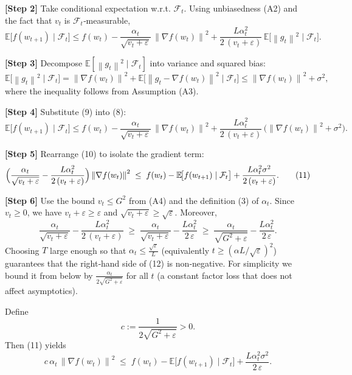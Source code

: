 \documentclass{article}
\newcommand{\E}{\mathbb{E}}
\newcommand{\norm}[1]{\left\lVert#1\right\rVert}
\begin{document}
\noindent\textbf{[Step 2]} Take conditional expectation w.r.t. $\mathcal{F}_t$.
Using unbiasedness (A2) and the fact that $v_t$ is $\mathcal{F}_t$‑measurable,
\[
\E\!\bigl[f(w_{t+1})\mid\mathcal{F}_t\bigr]
\le f(w_t)-\frac{\alpha_t}{\sqrt{v_t+\varepsilon}}\,
\norm{\nabla f(w_t)}^{2}
+\frac{L\alpha_t^{2}}{2\,(v_t+\varepsilon)}\,
\E\!\bigl[\norm{g_t}^{2}\mid\mathcal{F}_t\bigr].
\tag{8}
\]

\noindent\textbf{[Step 3]} Decompose $\E[\norm{g_t}^{2}\mid\mathcal{F}_t]$
into variance and squared bias:
\[
\E\!\bigl[\norm{g_t}^{2}\mid\mathcal{F}_t\bigr]
=\norm{\nabla f(w_t)}^{2}
+\E\!\bigl[\norm{g_t-\nabla f(w_t)}^{2}\mid\mathcal{F}_t\bigr]
\le \norm{\nabla f(w_t)}^{2}+\sigma^{2},
\tag{9}
\]
where the inequality follows from Assumption (A3).

\noindent\textbf{[Step 4]} Substitute (9) into (8):
\[
\E\!\bigl[f(w_{t+1})\mid\mathcal{F}_t\bigr]
\le f(w_t)-\frac{\alpha_t}{\sqrt{v_t+\varepsilon}}\,
\norm{\nabla f(w_t)}^{2}
+\frac{L\alpha_t^{2}}{2\,(v_t+\varepsilon)}\,
\bigl(\norm{\nabla f(w_t)}^{2}+\sigma^{2}\bigr).
\tag{10}
\]

\noindent\textbf{[Step 5]} Rearrange (10) to isolate the gradient term:
\[
\Bigl(\frac{\alpha_t}{\sqrt{v_t+\varepsilon}}
-\frac{L\alpha_t^{2}}{2\,(v_t+\varepsilon)}\Bigr)
\norm{\nabla f(w_t)}^{2}
\;\le\;
f(w_t)-\E\!\bigl[f(w_{t+1})\mid\mathcal{F}_t\bigr]
+\frac{L\alpha_t^{2}\sigma^{2}}{2\,(v_t+\varepsilon)} .
\tag{11}
\]

\noindent\textbf{[Step 6]} Use the bound $v_t\le G^{2}$ from (A4) and the
definition (3) of $\alpha_t$.
Since $v_t\ge0$, we have $v_t+\varepsilon\ge\varepsilon$ and
$\sqrt{v_t+\varepsilon}\ge\sqrt{\varepsilon}$.
Moreover,
\[
\frac{\alpha_t}{\sqrt{v_t+\varepsilon}}
-\frac{L\alpha_t^{2}}{2\,(v_t+\varepsilon)}
\;\ge\;
\frac{\alpha_t}{\sqrt{v_t+\varepsilon}}-
\frac{L\alpha_t^{2}}{2\,\varepsilon}
\;\ge\;
\frac{\alpha_t}{\sqrt{G^{2}+\varepsilon}}-
\frac{L\alpha_t^{2}}{2\,\varepsilon}.
\tag{12}
\]
Choosing $T$ large enough so that $\alpha_t\le\frac{\sqrt{\varepsilon}}{L}$
(equivalently $t\ge(\alpha L/\sqrt{\varepsilon})^{2}$) guarantees that the
right‑hand side of (12) is non‑negative.  For simplicity we bound it from
below by $\frac{\alpha_t}{2\sqrt{G^{2}+\varepsilon}}$ for all $t$ (a constant
factor loss that does not affect asymptotics).

Define
\[
c:=\frac{1}{2\sqrt{G^{2}+\varepsilon}} >0 .
\tag{13}
\]
Then (11) yields
\[
c\,\alpha_t\,\norm{\nabla f(w_t)}^{2}
\;\le\;
f(w_t)-\E\!\bigl[f(w_{t+1})\mid\mathcal{F}_t\bigr]
+\frac{L\alpha_t^{2}\sigma^{2}}{2\,\varepsilon}.
\tag{14}
\]
\end{document}
